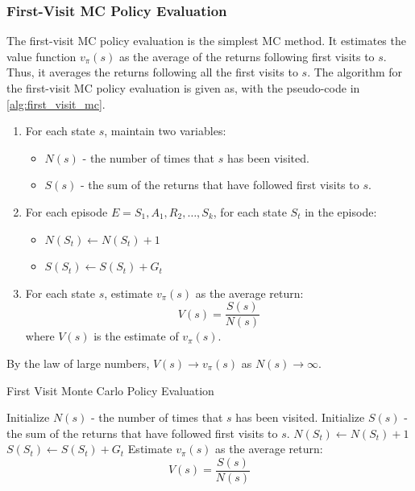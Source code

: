 \subsubsection{First-Visit MC Policy Evaluation}
The first-visit MC policy evaluation is the simplest MC method. It estimates
the value function \(v_{\pi}(s)\) as the average of the returns following first
visits to \(s\). Thus, it averages the returns following all the first visits to
\(s\).
The algorithm for the first-visit MC policy evaluation is given as, with the 
pseudo-code in \autoref{alg:first_visit_mc}.
\begin{enumerate}
    \item For each state \(s\), maintain two variables:
    \begin{itemize}
        \item \(N(s)\) - the number of times that \(s\) has been visited.
        \item \(S(s)\) - the sum of the returns that have followed first visits to \(s\).
    \end{itemize}
    \item For each episode \(E = S_1, A_1, R_2, \dots, S_k\), for each state \(S_t\) 
    in the episode:
    \begin{itemize}
        \item \(N(S_t) \leftarrow N(S_t) + 1\)
        \item \(S(S_t) \leftarrow S(S_t) + G_t\)
    \end{itemize}
    \item For each state \(s\), estimate \(v_{\pi}(s)\) as the average return:
    \[
        V(s) = \frac{S(s)}{N(s)}
    \]
    where \(V(s)\) is the estimate of \(v_{\pi}(s)\).
\end{enumerate}
By the law of large numbers, \(V(s) \to v_{\pi}(s)\) as \(N(s) \to \infty\). 

\begin{algorithm}[H]
    \caption{First Visit Monte Carlo Policy Evaluation}
    \label{alg:first_visit_mc}
    \begin{algorithmic}[1]
            \State Initialize $N(s)$ - the number of times that $s$ has been visited.
            \State Initialize $S(s)$ - the sum of the returns that have followed first visits to $s$.
        \EndFor
                \State $N(S_t) \leftarrow N(S_t) + 1$
                \State $S(S_t) \leftarrow S(S_t) + G_t$
            \EndFor
        \EndFor
            \State Estimate $v_{\pi}(s)$ as the average return:
            \[
                V(s) = \frac{S(s)}{N(s)}
            \]
        \EndFor
    \end{algorithmic}
\end{algorithm}

